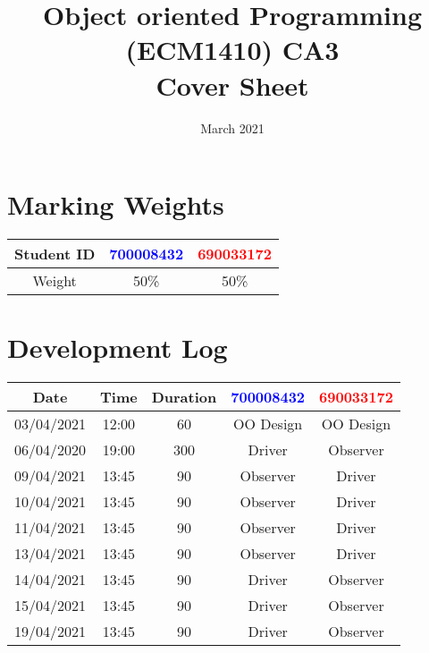 \documentclass{article}
\title{%
  Object oriented Programming (ECM1410) CA3 \\
  \large Cover Sheet}
\date{March 2021}
\begin{document}
\maketitle

\section{Marking Weights}
\begin{center}
\begin{tabular}{ |c|c|c| } 
 \hline
 Student ID & \textcolor{blue}{700008432} & \textcolor{red}{690033172} \\
 \hline
 Weight & 50\% & 50\% \\
 \hline
\end{tabular}
\end{center}

\section{Development Log}
\begin{tabular}{ |c|c|c|c|c| } 
 \hline
 Date & Time & Duration & \textcolor{blue}{700008432} & \textcolor{red}{690033172} \\
 \hline
 03/04/2021&12:00&60&OO Design&OO Design \\
 \hline
 06/04/2020&19:00&300&Driver&Observer \\
 \hline
 09/04/2021&13:45&90&Observer&Driver \\
 \hline
 10/04/2021&13:45&90&Observer&Driver \\
 \hline
 11/04/2021&13:45&90&Observer&Driver \\
 \hline
 13/04/2021&13:45&90&Observer&Driver \\
 \hline
 14/04/2021&13:45&90&Driver&Observer \\
 \hline
 15/04/2021&13:45&90&Driver&Observer
 \\
 19/04/2021&13:45&90&Driver&Observer \\
 \hline
\end{tabular}
\end{document}

